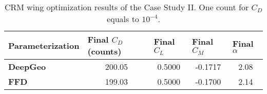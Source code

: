 \begin{table}[!b]
  \centering
  \caption{\small CRM wing optimization results of the Case Study II. One count for $C_D$ equals to $10^{-4}$.}
    \begin{tabular}{lcccc}
    \hline
    \textbf{Parameterization} &  \multicolumn{1}{l}{\textbf{Final} $C_D$ {\footnotesize(counts)}} & \multicolumn{1}{l}{\textbf{Final} $C_L$} & \multicolumn{1}{l}{\textbf{Final} $C_M$} & \multicolumn{1}{l}{\textbf{Final} $\alpha$}\\
    \hline
    \textbf{DeepGeo} & \num{200.05}  & \num{0.5000}  & -0.1717  & 2.08 \\
    \textbf{FFD} & \num{199.03}  & \num{0.5000}  & -0.1700  & 2.14 \\ 
    \hline
    \end{tabular}%
  \label{ch5:tab:crm_result}%
\end{table}%